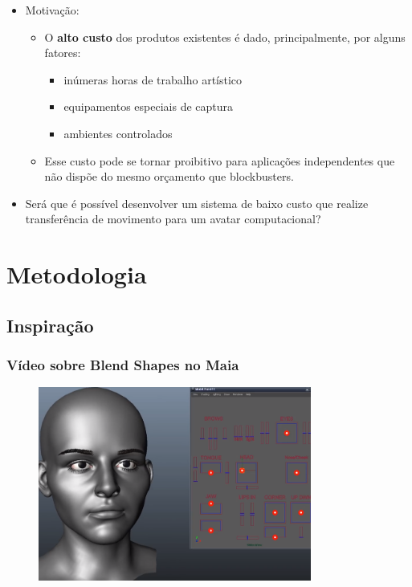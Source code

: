 \documentclass[brazil]{beamer}
\begin{document}
\begin{frame}
  \begin{itemize}
      \item Motivação:
      \begin{itemize}
        \item O \textbf{alto custo} dos produtos existentes é dado, principalmente, por alguns fatores: 
          \begin{itemize}
            \item inúmeras horas de trabalho artístico
            \item equipamentos especiais de captura
            \item ambientes controlados
          \end{itemize}
        \item Esse custo pode se tornar proibitivo para aplicações
          independentes que não dispõe do mesmo orçamento que blockbusters.
      \end{itemize}   
      \item Será que é possível desenvolver um sistema de baixo custo que
        realize transferência de movimento para um avatar computacional?
  \end{itemize} 

\end{frame}


\section{Metodologia}

\subsection{Inspiração}
\begin{frame}
	\frametitle{Vídeo sobre Blend Shapes no Maia}
      \begin{figure}
        \centering
        \includegraphics[width = 0.8\textwidth, keepaspectratio]{./img/maiaDemo.png}
      \end{figure}   
\end{frame}
\end{document}

